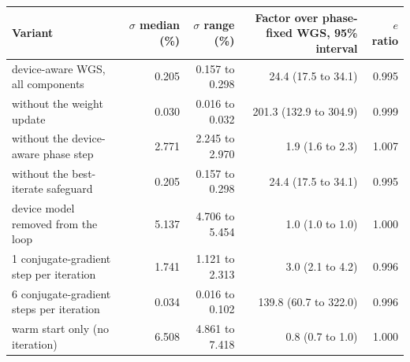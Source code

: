 \begin{tabular}{@{}l r r r r@{}}
\toprule
Variant & $\sigma$ median (\%) & $\sigma$ range (\%) & Factor over phase-fixed WGS, 95\% interval & $e$ ratio \\
\midrule
device-aware WGS, all components & 0.205 & 0.157 to 0.298 & 24.4 (17.5 to 34.1) & 0.995 \\
without the weight update & 0.030 & 0.016 to 0.032 & 201.3 (132.9 to 304.9) & 0.999 \\
without the device-aware phase step & 2.771 & 2.245 to 2.970 & 1.9 (1.6 to 2.3) & 1.007 \\
without the best-iterate safeguard & 0.205 & 0.157 to 0.298 & 24.4 (17.5 to 34.1) & 0.995 \\
device model removed from the loop & 5.137 & 4.706 to 5.454 & 1.0 (1.0 to 1.0) & 1.000 \\
1 conjugate-gradient step per iteration & 1.741 & 1.121 to 2.313 & 3.0 (2.1 to 4.2) & 0.996 \\
6 conjugate-gradient steps per iteration & 0.034 & 0.016 to 0.102 & 139.8 (60.7 to 322.0) & 0.996 \\
warm start only (no iteration) & 6.508 & 4.861 to 7.418 & 0.8 (0.7 to 1.0) & 1.000 \\
\bottomrule
\end{tabular}
